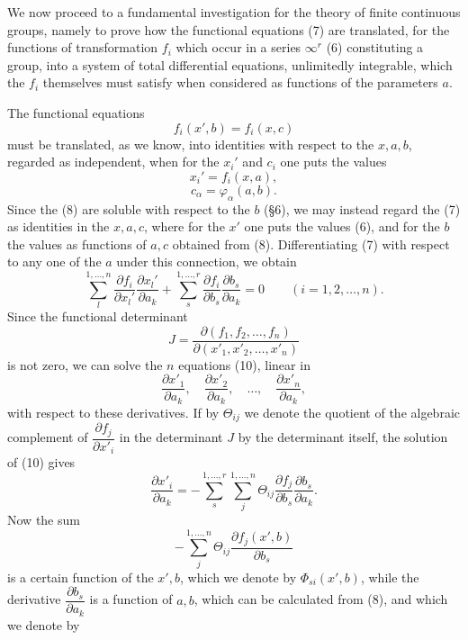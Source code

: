 \documentclass[11pt]{book}
\begin{document}
We now proceed to a fundamental investigation for the theory of finite continuous groups, namely to prove how the functional equations (7) are translated, for the functions of transformation $f_i$ which occur in a series $\infty^r$ (6) constituting a group, into a system of total differential equations, unlimitedly integrable, which the $f_i$ themselves must satisfy when considered as functions of the parameters $a$.

The functional equations
\begin{equation*}\tag{7}
 f_i(x',b)=f_i(x,c)
\end{equation*}
must be translated, as we know, into identities with respect to the $x,a,b$, regarded as independent, when for the $x_i'$ and $c_i$ one puts the values
\begin{equation*}\tag{6}
 x_i'=f_i(x,a),
\end{equation*}
\begin{equation*}\tag{8}
 c_\alpha=\varphi_\alpha(a,b).
\end{equation*}
Since the (8) are soluble with respect to the $b$ (\S{}6), we may instead regard the (7) as identities in the $x,a,c$, where for the $x'$ one puts the values (6), and for the $b$ the values as functions of $a,c$ obtained from (8). Differentiating (7) with respect to any one of the $a$ under this connection, we obtain
\begin{equation*}\tag{10}
 \sum\limits_l^{1,\ldots,n}\frac{\partial f_i}{\partial x_l'}\frac{\partial x_l'}{\partial a_k}
 +\sum\limits_s^{1,\ldots,r}\frac{\partial f_i}{\partial b_s}\frac{\partial b_s}{\partial a_k}=0
 \qquad (i=1,2,\ldots,n).
\end{equation*}
Since the functional determinant
\[
 J=\frac{\partial(f_1,f_2,\ldots,f_n)}{\partial(x'_1,x'_2,\ldots,x'_n)}
\]
is not zero, we can solve the $n$ equations (10), linear in
\[
 \frac{\partial x'_1}{\partial a_k},\quad
 \frac{\partial x'_2}{\partial a_k},\quad\ldots,\quad
 \frac{\partial x'_n}{\partial a_k},
\]
with respect to these derivatives. If by $\Theta_{ij}$ we denote the quotient of the algebraic complement of $\dfrac{\partial f_j}{\partial x'_i}$ in the determinant $J$ by the determinant itself, the solution of (10) gives
\[
 \frac{\partial x'_i}{\partial a_k}
 =-\sum\limits_s^{1,\ldots,r}\sum\limits_j^{1,\ldots,n}
 \Theta_{ij}\frac{\partial f_j}{\partial b_s}\frac{\partial b_s}{\partial a_k}.
\]
Now the sum
\[
 -\sum\limits_j^{1,\ldots,n}\Theta_{ij}\frac{\partial f_j(x',b)}{\partial b_s}
\]
is a certain function of the $x',b$, which we denote by $\Phi_{si}(x',b)$, while the derivative $\dfrac{\partial b_s}{\partial a_k}$ is a function of $a,b$, which can be calculated from (8), and which we denote by
\end{document}
